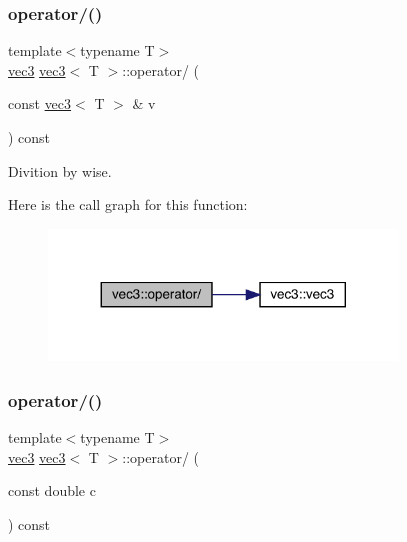 \mbox{\label{structvec3_ad2f8afc304554e7b5d7331030e8bc91d}} 
\subsubsection{\texorpdfstring{operator/()}{operator/()}\hspace{0.1cm}{\footnotesize\ttfamily [1/2]}}
{\footnotesize\ttfamily template$<$typename T$>$ \\
\mbox{\hyperlink{structvec3}{vec3}} \mbox{\hyperlink{structvec3}{vec3}}$<$ T $>$\+::operator/ (\begin{DoxyParamCaption}\item[{const \mbox{\hyperlink{structvec3}{vec3}}$<$ T $>$ \&}]{v }\end{DoxyParamCaption}) const\hspace{0.3cm}{\ttfamily [inline]}}



Divition by wise. 

Here is the call graph for this function\+:\nopagebreak
\begin{figure}[H]
\begin{center}
\leavevmode
\includegraphics[width=263pt]{structvec3_ad2f8afc304554e7b5d7331030e8bc91d_cgraph}
\end{center}
\end{figure}
\mbox{\label{structvec3_aefb92d2dd7d6410991dffc593e9ab874}} 
\subsubsection{\texorpdfstring{operator/()}{operator/()}\hspace{0.1cm}{\footnotesize\ttfamily [2/2]}}
{\footnotesize\ttfamily template$<$typename T$>$ \\
\mbox{\hyperlink{structvec3}{vec3}} \mbox{\hyperlink{structvec3}{vec3}}$<$ T $>$\+::operator/ (\begin{DoxyParamCaption}\item[{const double}]{c }\end{DoxyParamCaption}) const\hspace{0.3cm}{\ttfamily [inline]}}



